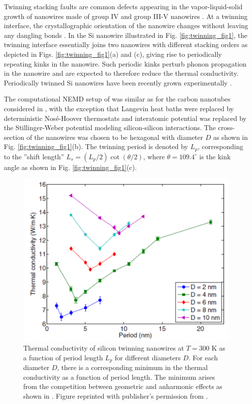 Twinning stacking faults \cite{cahn54} are common defects appearing in the vapor-liquid-solid growth of nanowires made of group IV and group III-V nanowires \cite{johansson06,xiong06,davidson07,algra08}. At a twinning interface, the crystallographic orientation of the nanowire changes without leaving any dangling bonds \cite{korgel06}. In the Si nanowire illustrated in Fig. \ref{fig:twinning_fig1}, the twinning interface essentially joins two nanowires with different stacking orders as depicted in Figs. \ref{fig:twinning_fig1}(a) and (c), giving rise to periodically repeating kinks in the nanowire. Such periodic kinks perturb phonon propagation in the nanowire and are expected to therefore reduce the thermal conductivity. Periodically twinned Si nanowires have been recently grown experimentally \cite{ruffino15}.

The computational NEMD setup of  was similar as for the carbon nanotubes considered in , with the exception that Langevin heat baths were replaced by deterministic Nos\'e-Hoover thermostats \cite{nose84,hoover85} and interatomic potential was replaced by the Stillinger-Weber potential \cite{stillinger85} modeling silicon-silicon interactions. The cross-section of the nanowires was chosen to be hexagonal with diameter $D$ as shown in Fig. \ref{fig:twinning_fig1}(b). The twinning period is denoted by $L_p$, corresponding to the ''shift length'' $L_s=(L_p/2)\cot(\theta/2)$, where $\theta=109.4^{\circ}$ is the kink angle as shown in Fig. \ref{fig:twinning_fig1}(c). 


\begin{figure}[tb]
 \begin{center}
   \includegraphics[width=.89\columnwidth]{pics/twinning_fig2a_mod.pdf} 
  \caption{Thermal conductivity of silicon twinning nanowires at $T=300$ K as a function of period length $L_p$ for different diameters $D$. For each diameter $D$, there is a corresponding minimum in the thermal conductivity as a function of period length. The minimum arises from the competition between geometric and anharmonic effects as shown in . Figure reprinted with publisher's permission from .}  
\label{fig:twinning_fig2}
 \end{center}
\end{figure}


